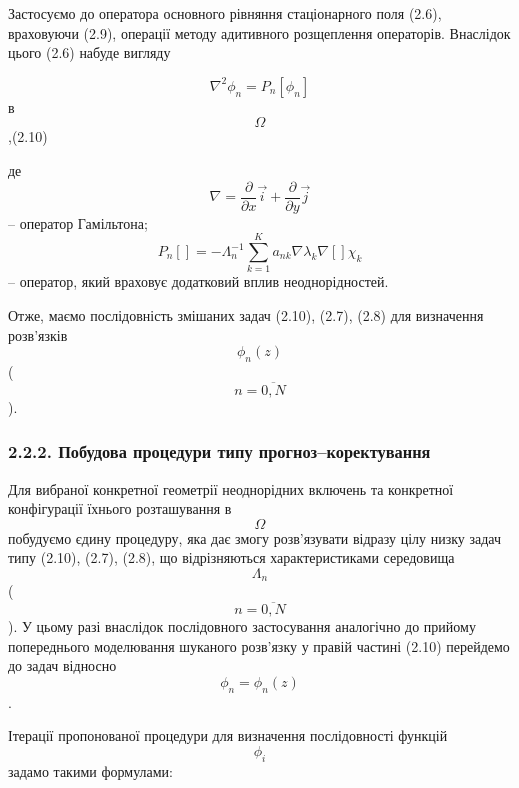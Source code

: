 Застосуємо до оператора основного рівняння стаціонарного поля (2.6),
враховуючи (2.9), операції методу адитивного розщеплення операторів.
Внаслідок цього (2.6) набуде вигляду

\[{\nabla^{2}{\phi_{n} = P_{n}}\left\lbrack \phi_{n} \right\rbrack}{}\]
в \[\Omega{}\],(2.10)

де
\[{{\nabla = \frac{\partial}{\partial x}}{\overrightarrow{i} + \frac{\partial}{\partial y}}\overrightarrow{j}}{}\]
-- оператор Гамільтона;
\[{P_{n}{\left\lbrack {} \right\rbrack = {- \Lambda_{n}^{- 1}}}{\sum\limits_{k = 1}^{K}{a_{\mathit{\text{nk}}}\nabla\lambda_{k}\nabla\left\lbrack {} \right\rbrack}}\chi_{k}}{}\]
-- оператор, який враховує додатковий вплив неоднорідностей.

Отже, маємо послідовність змішаних задач (2.10), (2.7), (2.8) для
визначення розв'язків \[{\phi_{n}\left( z \right)}{}\]
(\[{n = \overline{0,N}}{}\]).

\hypertarget{ux43fux43eux431ux443ux434ux43eux432ux430-ux43fux440ux43eux446ux435ux434ux443ux440ux438-ux442ux438ux43fux443-ux43fux440ux43eux433ux43dux43eux437ux43aux43eux440ux435ux43aux442ux443ux432ux430ux43dux43dux44f}{%
\subsubsection[2.2.2. Побудова процедури типу
прогноз--коректування]{\texorpdfstring{\protect\hypertarget{anchor-32}{}{}\protect\hypertarget{anchor-33}{}{}2.2.2.
Побудова процедури типу
прогноз--коректування}{2.2.2. Побудова процедури типу прогноз--коректування}}\label{ux43fux43eux431ux443ux434ux43eux432ux430-ux43fux440ux43eux446ux435ux434ux443ux440ux438-ux442ux438ux43fux443-ux43fux440ux43eux433ux43dux43eux437ux43aux43eux440ux435ux43aux442ux443ux432ux430ux43dux43dux44f}}

Для вибраної конкретної\textbf{ }геометрії неоднорідних включень та
конкретної конфігурації їхнього розташування в \[\Omega{}\] побудуємо
єдину процедуру, яка дає змогу розв'язувати відразу цілу низку задач
типу (2.10), (2.7), (2.8), що відрізняються характеристиками середовища
\[\Lambda_{n}{}\](\[{n = \overline{0,N}}{}\]). У цьому разі внаслідок
послідовного застосування аналогічно до прийому попереднього моделювання
шуканого розв'язку у правій частині (2.10) перейдемо до задач відносно
\[{{\phi_{n}^{} = \phi_{n}^{}}\left( z \right)}{}\].

Ітерації пропонованої процедури для визначення послідовності функцій
\[\phi_{i}^{}{}\]задамо такими формулами:

